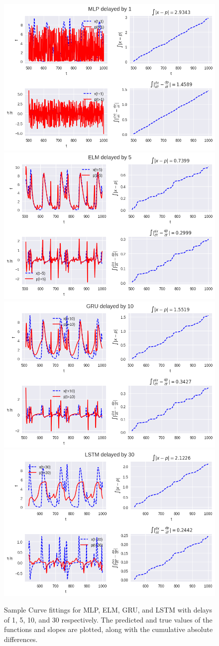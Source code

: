 \documentclass[11pt]{article}
\begin{document}
 \begin{figure}
   \begin{center}
   \includegraphics[width=.48\textwidth]{figures/MLP_1_mg2.png}
   \includegraphics[width=.48\textwidth]{figures/ELM_5_mg2.png}
   \includegraphics[width=.48\textwidth]{figures/GRU_10_mg2.png}
   \includegraphics[width=.48\textwidth]{figures/LSTM_30_mg2.png}
 \end{center}
 \caption{Sample Curve fittings for MLP, ELM, GRU, and LSTM with
   delays of 1, 5, 10, and 30 respectively. The predicted and true
   values of the functions and slopes are plotted, along with the
   cumulative absolute differences.}
 \label{fig:mg2_func}
   \end{figure}
\end{document}
